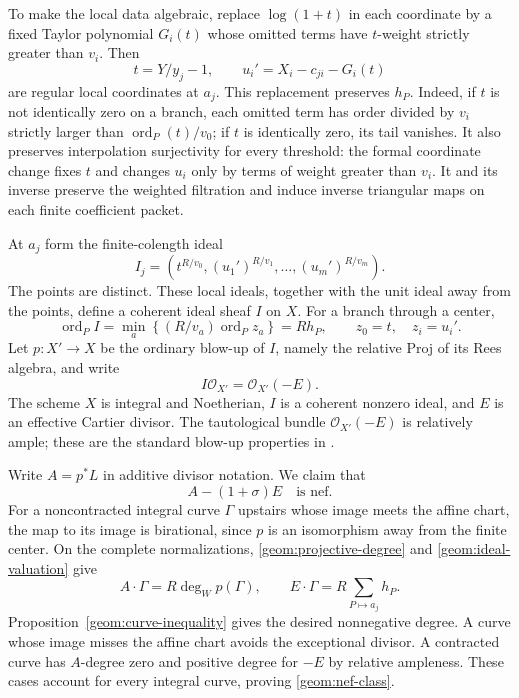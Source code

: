 \documentclass[11pt]{article}
\theoremstyle{definition}
\theoremstyle{remark}
\numberwithin{equation}{section}
\begin{document}
To make the local data algebraic, replace $\log(1+t)$ in each
coordinate by a fixed Taylor polynomial $G_i(t)$ whose omitted
terms have $t$-weight strictly greater than $v_i$. Then
\[
 t=Y/y_j-1,\qquad u_i'=X_i-c_{ji}-G_i(t)
\]
are regular local coordinates at $a_j$. This replacement preserves
$h_P$. Indeed, if $t$ is not identically zero on a branch, each
omitted term has order divided by $v_i$ strictly larger than
$\operatorname{ord}_P(t)/v_0$; if $t$ is identically zero, its tail
vanishes. It also preserves interpolation surjectivity for every
threshold: the formal coordinate change fixes $t$ and changes
$u_i$ only by terms of weight greater than $v_i$. It and its inverse
preserve the weighted filtration and induce inverse triangular maps
on each finite coefficient packet.

At $a_j$ form the finite-colength ideal
\[
 I_j=\left(t^{R/v_0},(u_1')^{R/v_1},\ldots,(u_m')^{R/v_m}\right).
\]
The points are distinct. These local ideals, together with the unit
ideal away from the points, define a coherent ideal sheaf $I$ on $X$.
For a branch through a center,
\begin{equation}
\label{geom:ideal-valuation}
 \operatorname{ord}_P I
 =\min_a\left\{(R/v_a)\operatorname{ord}_P z_a\right\}
 =Rh_P,
 \qquad z_0=t,\quad z_i=u_i'.
\end{equation}
Let $p:X'\to X$ be the ordinary blow-up of $I$, namely the relative
Proj of its Rees algebra, and write
\[
 I\mathcal O_{X'}=\mathcal O_{X'}(-E).
\]
The scheme $X$ is integral and Noetherian, $I$ is a coherent nonzero
ideal, and $E$ is an effective Cartier divisor. The tautological
bundle $\mathcal O_{X'}(-E)$ is relatively ample; these are the
standard blow-up properties in
\cite[Tags~02OS, 02ND, and~02NS]{stacks}.

Write $A=p^*L$ in additive divisor notation. We claim that
\begin{equation}
\label{geom:nef-class}
 A-(1+\sigma)E\quad\text{is nef}.
\end{equation}
For a noncontracted integral curve $\Gamma$ upstairs whose image
meets the affine chart, the map to its image is birational, since
$p$ is an isomorphism away from the finite center. On the complete
normalizations, \eqref{geom:projective-degree} and
\eqref{geom:ideal-valuation} give
\[
 A\cdot\Gamma=R\deg_W p(\Gamma),\qquad
 E\cdot\Gamma=R\sum_{P\mapsto a_j}h_P.
\]
Proposition~\ref{geom:curve-inequality} gives the desired nonnegative
degree. A curve whose image misses the affine chart avoids the
exceptional divisor. A contracted curve has $A$-degree zero and
positive degree for $-E$ by relative ampleness. These cases account
for every integral curve, proving \eqref{geom:nef-class}.
\end{document}
